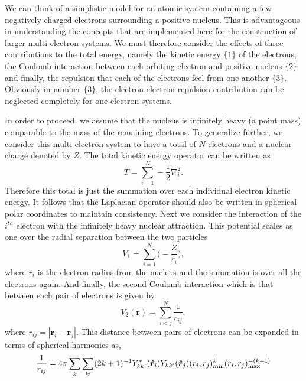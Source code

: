 We can think of a simplistic model for an atomic system containing a few negatively charged electrons surrounding a positive nucleus. This is advantageous in understanding the concepts that are implemented here for the construction of larger multi-electron systems. We must therefore consider the effects of three contributions to the total energy, namely the kinetic energy $\{1\}$ of the electrons, the Coulomb interaction between each orbiting electron and positive nucleus $\{2\}$ and finally, the repulsion that each of the electrons feel from one another $\{3\}$. Obviously in number $\{3\}$, the electron-electron repulsion contribution can be neglected completely for one-electron systems.

In order to proceed, we assume that the nucleus is infinitely heavy (a point mass) comparable to the mass of the remaining electrons. To generalize further, we consider this multi-electron system to have a total of $N$-electrons and a nuclear charge denoted by $Z$. The total kinetic energy operator can be written as
	\begin{equation}\label{eq:many_T}
	T=\sum_{i=1}^N-\frac{1}{2}\nabla_i^2.
	\end{equation}
Therefore this total is just the summation over each individual electron kinetic energy. It follows that the Laplacian operator should also be written in spherical polar coordinates to maintain consistency. Next we consider the interaction of the $i^{th}$ electron with the infinitely heavy nuclear attraction. This potential scales as one over the radial separation between the two particles
	\begin{equation}\label{eq:many_V1}
	V_1=\sum_{i=1}^N\Big(-\frac{Z}{r_i}\Big),
	\end{equation}
where $r_i$ is the electron radius from the nucleus and the summation is over all the electrons again. And finally, the second Coulomb interaction which is that between each pair of electrons is given by
	\begin{equation}\label{eq:many_V2}
	V_2(\boldsymbol{r})=\sum_{i<j}^N\frac{1}{r_{ij}},
	\end{equation}
where $r_{ij} = | \boldsymbol{r}_i - \boldsymbol{r}_j |$. This distance between pairs of electrons can be expanded in terms of spherical harmonics as,
\begin{equation}\label{eq:many_rijspher}
\frac{1}{r_{ij}} = 4\pi\sum_{k}\sum_{k'}(2k+1)^{-1}Y_{kk'}^*(\boldsymbol{\hat{r}}_i)Y_{kk'}(\boldsymbol{\hat{r}}_j)(r_i, r_j)^{k}_{\rm min}(r_i, r_j)^{-(k+1)}_{\rm max}
\end{equation}
